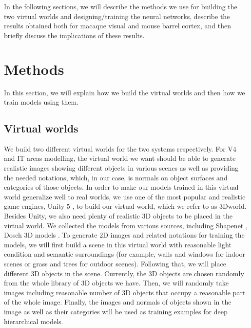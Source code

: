 \documentclass[12pt]{article}
\begin{document}
In the following sections, we will describe the methods we use for building the two virtual worlds and designing/training the neural networks, describe the results obtained both for macaque visual and mouse barrel cortex, and then briefly discuss the implications of these results.

\section*{Methods}

In this section, we will explain how we build the virtual worlds and then how we train models using them.

\subsection*{Virtual worlds}

We build two different virtual worlds for the two systems respectively. For V4 and IT areas modelling, the virtual world we want should be able to generate realistic images showing different objects in various scenes as well as providing the needed notations, which, in our case, is normals on object surfaces and categories of those objects.
In order to make our models trained in this virtual world generalize well to real worlds, we use one of the most popular and realistic game engines, Unity 5 \cite{unity}, to build our virtual world, which we refer to as 3Dworld.
Besides Unity, we also need plenty of realistic 3D objects to be placed in the virtual world. We collected the models from various sources, including Shapenet \cite{Chang2015}, Dosch 3D models \cite{dosch}. To generate 2D images and related notations for training the models, we will first build a scene in this virtual world with reasonable light condition and semantic surroundings (for example, walls and windows for indoor scenes or grass and trees for outdoor scenes).
Following that, we will place different 3D objects in the scene. Currently, the 3D objects are chosen randomly from the whole library of 3D objects we have. Then, we will randomly take images including reasonable number of 3D objects that occupy a reasonable part of the whole image. Finally, the images and normals of objects shown in the image as well as their categories will be used as training examples for deep hierarchical models.
\end{document}
